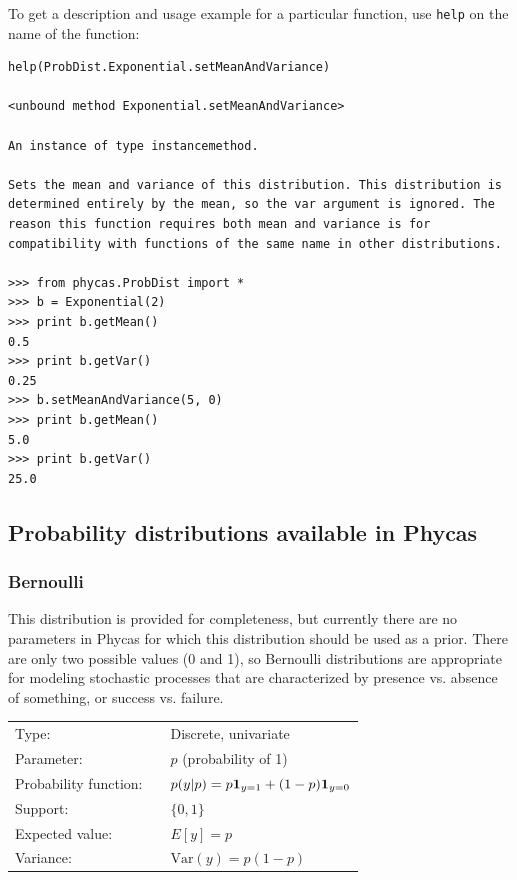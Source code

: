 \documentclass[10pt]{article}
\newcommand{\code}[1]{{\tt #1}}					%
\newcommand{\one}[1]{\mbox{${\bf 1}_{#1}$}}
\newcommand{\Var}{\mbox{Var}}
\begin{document}
%
To get a description and usage example for a particular function, use \code{help} on the name of the function:
%
\begin{verbatim}
help(ProbDist.Exponential.setMeanAndVariance)

<unbound method Exponential.setMeanAndVariance>

An instance of type instancemethod.

Sets the mean and variance of this distribution. This distribution is
determined entirely by the mean, so the var argument is ignored. The
reason this function requires both mean and variance is for
compatibility with functions of the same name in other distributions.

>>> from phycas.ProbDist import *
>>> b = Exponential(2)
>>> print b.getMean()
0.5
>>> print b.getVar()
0.25
>>> b.setMeanAndVariance(5, 0)
>>> print b.getMean()
5.0
>>> print b.getVar()
25.0
\end{verbatim}

\subsection{Probability distributions available in Phycas}
\label{subsec:phycasprobdists}
\subsubsection{Bernoulli}
\renewcommand{\arraystretch}{1.5}

This distribution is provided for completeness, but currently there are no parameters in Phycas for which this distribution should be used as a prior. There are only two possible values (0 and 1), so Bernoulli distributions are appropriate for modeling stochastic processes that are characterized by presence vs. absence of something, or success vs. failure.

\begin{tabular}{lcl}
Type:                 & & Discrete, univariate \\
Parameter:            & & $p$ (probability of 1) \\
Probability function: & & $p(y|p) = p \one{y=1} + (1-p) \one{y=0}$ \\
Support:              & & $\{0,1\}$  \\
Expected value:       & & $E[y] = p$ \\
Variance:             & & $\Var(y) = p(1-p)$ 
\end{tabular}
\end{document}
